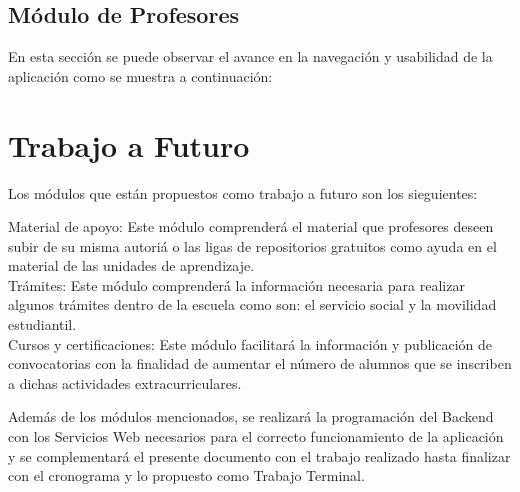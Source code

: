 \subsection{Módulo de Profesores}

En esta sección se puede observar el avance en la navegación y usabilidad de la aplicación como se muestra a continuación:


\section{Trabajo a Futuro}

Los módulos que están propuestos como trabajo a futuro son los sieguientes: \\

\begin{UClist} 
	\UCli Material de apoyo: 
	Este módulo comprenderá el material que profesores deseen subir de su misma autoriá o las ligas de repositorios gratuitos como ayuda en el material de las unidades de aprendizaje.\\
	
	\UCli Trámites: 
	Este módulo comprenderá la información necesaria para realizar algunos trámites dentro de la escuela como son: el servicio social y la movilidad estudiantil.\\
	
	\UCli Cursos y certificaciones: 
	Este módulo facilitará la información y publicación de convocatorias con la finalidad de aumentar el número de alumnos que se inscriben a dichas actividades extracurriculares.\\
\end{UClist} 

Además de los módulos mencionados, se realizará la programación del Backend con los Servicios Web necesarios para el correcto funcionamiento de la aplicación y se complementará el presente documento con el trabajo realizado hasta finalizar con el cronograma y lo propuesto como Trabajo Terminal.
